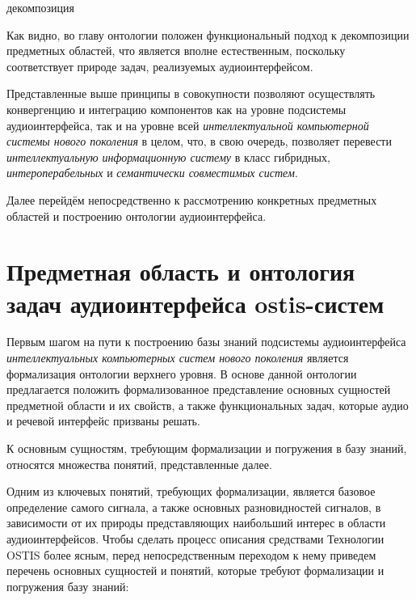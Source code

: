 \begin{SCn}
	\begin{scnreltoset}{декомпозиция}
	\end{scnreltoset}
\end{SCn}

Как видно, во главу онтологии положен функциональный подход к декомпозиции предметных областей, что является вполне естественным, поскольку соответствует природе задач, реализуемых аудиоинтерфейсом.

Представленные выше принципы в совокупности позволяют осуществлять конвергенцию и интеграцию компонентов как на уровне подсистемы аудиоинтерфейса, так и на уровне всей \textit{интеллектуальной компьютерной системы нового поколения} в целом, что, в свою очередь, позволяет перевести \textit{интеллектуальную информационную систему} в класс гибридных, \textit{интероперабельных} и \textit{семантически совместимых систем}.
  
 Далее перейдём непосредственно к рассмотрению конкретных предметных областей и построению онтологии аудиоинтерфейса.

\section{Предметная область и онтология задач аудиоинтерфейса ostis-систем}
\label{sec_audio_interfaces_subject_area_problems}

Первым шагом на пути к построению базы знаний подсистемы аудиоинтерфейса \textit{интеллектуальных компьютерных систем нового поколения} является формализация онтологии верхнего уровня. В основе данной онтологии предлагается положить формализованное представление основных сущностей предметной области и их свойств, а также функциональных задач, которые аудио и речевой интерфейс призваны решать. 

К основным сущностям, требующим формализации и погружения в базу знаний, относятся множества понятий, представленные далее. 

Одним из ключевых понятий, требующих формализации, является базовое определение самого сигнала, а также основных разновидностей сигналов, в зависимости от их природы представляющих наибольший интерес в области аудиоинтерфейсов. Чтобы сделать процесс описания средствами Технологии OSTIS более ясным, перед непосредственным переходом к нему приведем перечень основных сущностей и понятий, которые требуют формализации и погружения базу знаний:

